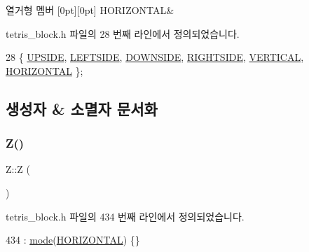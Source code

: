 \begin{DoxyEnumFields}{열거형 멤버}
[0pt][0pt]{}\mbox{\label{class_block_a33a96023993478ad4b52426188454765a883bda1b4a0cb6d25d8b3c3465f0cfef}} 
H\+O\+R\+I\+Z\+O\+N\+T\+AL&\\
\hline

\end{DoxyEnumFields}


tetris\+\_\+block.\+h 파일의 28 번째 라인에서 정의되었습니다.


\begin{DoxyCode}
28 \{ \mbox{\hyperlink{class_block_a33a96023993478ad4b52426188454765a4529e89ca1c08cc5f81181e355719fad}{UPSIDE}}, \mbox{\hyperlink{class_block_a33a96023993478ad4b52426188454765a9c855bf91465e7da98901d7900740919}{LEFTSIDE}}, \mbox{\hyperlink{class_block_a33a96023993478ad4b52426188454765a73fd4ad0ff8642235ec8549f9290d13b}{DOWNSIDE}}, \mbox{\hyperlink{class_block_a33a96023993478ad4b52426188454765a005424e665ea0b83edfaf9ddb3ab85a1}{RIGHTSIDE}}, \mbox{\hyperlink{class_block_a33a96023993478ad4b52426188454765a76628d7877667ccb2f6e549b89466a4a}{VERTICAL}}, 
      \mbox{\hyperlink{class_block_a33a96023993478ad4b52426188454765a883bda1b4a0cb6d25d8b3c3465f0cfef}{HORIZONTAL}} \}; 
\end{DoxyCode}


\subsection{생성자 \& 소멸자 문서화}
\mbox{\label{class_z_a199d7267ca3200d8c124955f710ec788}} 
\subsubsection{\texorpdfstring{Z()}{Z()}}
{\footnotesize\ttfamily Z\+::Z (\begin{DoxyParamCaption}{ }\end{DoxyParamCaption})\hspace{0.3cm}{\ttfamily [inline]}}



tetris\+\_\+block.\+h 파일의 434 번째 라인에서 정의되었습니다.


\begin{DoxyCode}
434 : \mbox{\hyperlink{class_z_a8324fb6e9f23196a9649ab838aabcc74}{mode}}(\mbox{\hyperlink{class_block_a33a96023993478ad4b52426188454765a883bda1b4a0cb6d25d8b3c3465f0cfef}{HORIZONTAL}}) \{\}
\end{DoxyCode}



